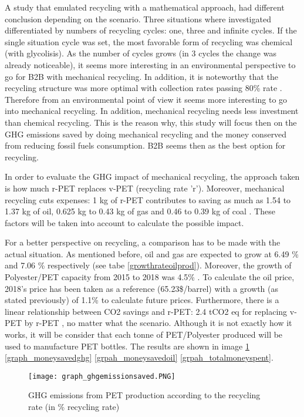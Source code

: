 \documentclass[twoside,a4paper,12pt]{report}
\begin{document}
A study that emulated recycling with a mathematical approach, had different conclusion depending on the scenario. Three situations where  investigated differentiated by numbers of recycling cycles: one, three and infinite cycles. If the single situation cycle was set, the most favorable form of  recycling was chemical (with glycolisis). As the number of cycles grows (in 3 cycles the change was already noticeable), it seems more interesting in an environmental perspective to go for B2B with mechanical recycling. In addition, it is noteworthy that the recycling structure was more optimal with collection rates passing 80\% rate \cite{Komly2012}. Therefore from an environmental point of view it seems more interesting to go into mechanical recycling. In addition, mechanical recycling needs less investment than chemical recycling. This is the reason why, this study will focus then on the GHG emissions saved by doing mechanical recycling and the money conserved from reducing fossil fuels consumption. B2B seems then as the best option for recycling.


In order to evaluate the GHG impact of mechanical recycling, the approach taken is how much r-PET replaces v-PET (recycling rate 'r'). Moreover, mechanical recycling cuts expenses: 1 kg of r-PET contributes to saving as much as 1.54 to 1.37 kg of oil, 0.625 kg to 0.43 kg of gas and 0.46 to 0.39 kg of coal \cite{Perugini2004}. These factors will be taken into account to calculate the possible impact.

For a better perspective on recycling, a comparison has to be made with the actual situation. As mentioned before, oil and gas are expected to grow at 6.49 \% and 7.06 \%  respectively (see tabe \ref{growthrateoilprod}). Moreover, the growth of Polyester/PET capacity from 2015 to 2018 was 4.5\% \cite{PTITpetrochem2018}. To calculate the oil price, 2018's price has been taken as a reference (65.23\$/barrel) with a growth (as stated previously) of 1.1\% to calculate future prices. Furthermore, there is a linear relationship between CO2 savings and r-PET: 2.4 tCO2 eq for replacing v-PET by r-PET \cite{Shen2011}, no matter what the scenario. Although it is not exactly how it works, it will be consider that each tonne of PET/Polyester produced will be used to manufacture PET bottles. The results are shown in image \ref{graph_ghgemissionssaved} \ref{graph_moneysavedghg} \ref{grpah_moneysavedoil} \ref{grpah_totalmoneyspent}.

\begin{figure} %
    \centering
    \texttt{[image: graph\_ghgemissionsaved.PNG]}
    \caption{GHG emissions from PET production according to the recycling rate (in \% recycling rate)}
     \label{graph_ghgemissionssaved} 
\end{figure}
\end{document}
